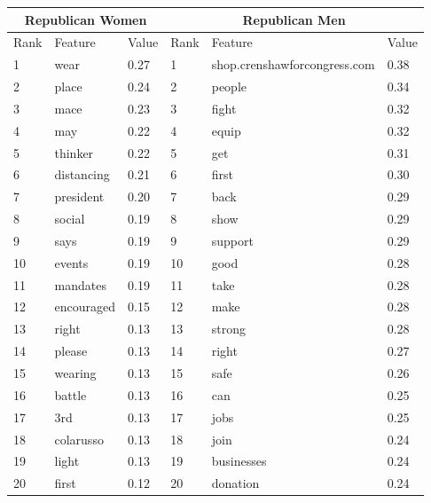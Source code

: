 \begin{tabular}{l|l|l|l|l|l}
    \hline
            \multicolumn{3}{c}{Republican Women}&\multicolumn{3}{c}{Republican Men}\\\hline
        Rank &Feature & Value & Rank & Feature & Value \\\hline
        1 & wear & 0.27 & 1 & shop.crenshawforcongress.com & 0.38 \\ 
        2 & place & 0.24 & 2 & people & 0.34 \\ 
        3 & mace & 0.23 & 3 & fight & 0.32 \\ 
        4 & may & 0.22 & 4 & equip & 0.32 \\ 
        5 & thinker & 0.22 & 5 & get & 0.31 \\ 
        6 & distancing & 0.21 & 6 & first & 0.30 \\ 
        7 & president & 0.20 & 7 & back & 0.29 \\ 
        8 & social & 0.19 & 8 & show & 0.29 \\ 
        9 & says & 0.19 & 9 & support & 0.29 \\ 
        10 & events & 0.19 & 10 & good & 0.28 \\ 
        11 & mandates & 0.19 & 11 & take & 0.28 \\ 
        12 & encouraged & 0.15 & 12 & make & 0.28 \\ 
        13 & right & 0.13 & 13 & strong & 0.28 \\ 
        14 & please & 0.13 & 14 & right & 0.27 \\ 
        15 & wearing & 0.13 & 15 & safe & 0.26 \\ 
        16 & battle & 0.13 & 16 & can & 0.25 \\ 
        17 & 3rd & 0.13 & 17 & jobs & 0.25 \\ 
        18 & colarusso & 0.13 & 18 & join & 0.24 \\ 
        19 & light & 0.13 & 19 & businesses & 0.24 \\ 
        20 & first & 0.12 & 20 & donation & 0.24 \\ \hline
    \end{tabular}

        